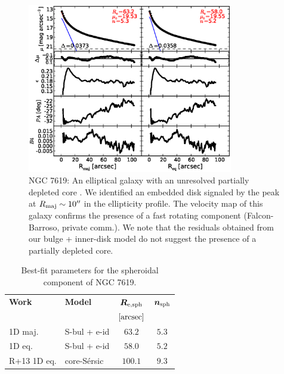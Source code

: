 \documentclass[preprint2]{emulateapj}
\newcommand{\fitfigurewidth}{0.8\textwidth}
\begin{document}
  \begin{figure}[h]
  \begin{center}
  \includegraphics[width=\fitfigurewidth]{n7619_1Dfit.eps}
  \caption{NGC 7619: 
  An elliptical galaxy with an unresolved partially depleted core \citep{rusli2013}. %
  We identified an embedded disk signaled by the peak at $R_{\rm maj} \sim 10''$ in the ellipticity profile.
  The velocity map of this galaxy confirms the presence of a fast rotating component (Falcon-Barroso, private comm.).
  We note that the residuals obtained from our bulge + inner-disk model do not suggest the presence of a partially depleted core.
  }
  \label{fig:n7619}
  \end{center}
  \end{figure}

  \begin{table}[h]
  \small
  \caption{Best-fit parameters for the spheroidal component of NGC 7619.}
  \begin{center}
  \begin{tabular}{llcc}
  \hline
  {\bf Work} & {\bf Model}   & $\bm R_{\rm e,sph}$    & $\bm n_{\rm sph}$ \\
    &  &  $[\rm arcsec]$ & \\
  \hline
  1D maj. & S-bul + e-id & $63.2$  &  $5.3$ \\
  1D eq.  & S-bul + e-id & $58.0$  &  $5.2$ \\
  \hline
  R+13 1D eq.      & core-S\'ersic & $100.1$  &  $9.3$ \\
  \hline
  \end{tabular}
  \end{center}
  \label{tab:n7619}
  \end{table}
\end{document}
